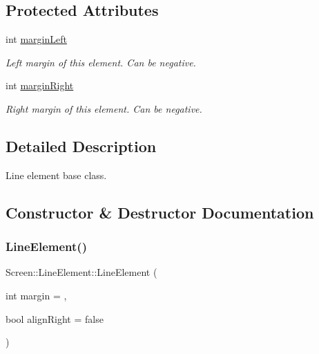 \subsection*{Protected Attributes}
\begin{DoxyCompactItemize}
\item 
\mbox{\label{classScreen_1_1LineElement_a9ed23f9510a11334af9be6f53965f7a6}} 
int \mbox{\hyperlink{classScreen_1_1LineElement_a9ed23f9510a11334af9be6f53965f7a6}{margin\+Left}}
\begin{DoxyCompactList}\small\item\em Left margin of this element. Can be negative. \end{DoxyCompactList}\item 
\mbox{\label{classScreen_1_1LineElement_a3a2077f01072be8e8fd0f4539b85beb0}} 
int \mbox{\hyperlink{classScreen_1_1LineElement_a3a2077f01072be8e8fd0f4539b85beb0}{margin\+Right}}
\begin{DoxyCompactList}\small\item\em Right margin of this element. Can be negative. \end{DoxyCompactList}\end{DoxyCompactItemize}


\subsection{Detailed Description}
Line element base class. 

\subsection{Constructor \& Destructor Documentation}
\mbox{\label{classScreen_1_1LineElement_a3f822f160e15ee96022b95026e52ee42}} 
\subsubsection{\texorpdfstring{Line\+Element()}{LineElement()}\hspace{0.1cm}{\footnotesize\ttfamily [1/2]}}
{\footnotesize\ttfamily Screen\+::\+Line\+Element\+::\+Line\+Element (\begin{DoxyParamCaption}\item[{int}]{margin = {},  }\item[{bool}]{align\+Right = {\ttfamily false} }\end{DoxyParamCaption})}



